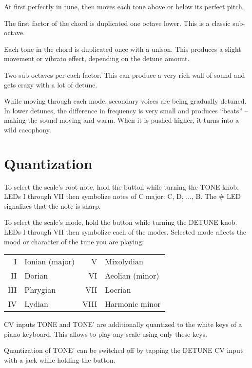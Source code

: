 \documentclass[10pt,nofoldmark,nocombine]{leaflet} %
\newenvironment{packed_enumerate_i}{
\begin{enumerate}[I]
  \setlength{\itemsep}{1pt}
  \setlength{\parskip}{0pt}
  \setlength{\parsep}{0pt}
}{\end{enumerate}}
\begin{document}
\begin{packed_enumerate_i}
  \item At first perfectly in tune, then moves each tone above or below its perfect pitch.
  \item The first factor of the chord is duplicated one octave lower. This is a classic sub-octave.
  \item Each tone in the chord is duplicated once with a unison. This produces a slight movement or vibrato effect, depending on the detune amount.
  \item Two sub-octaves per each factor. This can produce a very rich wall of sound and gets crazy with a lot of detune.
\end{packed_enumerate_i}

While moving through each mode, secondary voices are being gradually detuned. In lower detunes, the difference in frequency is very small and produces ``beats'' -- making the sound moving and warm. When it is pushed higher, it turns into a wild cacophony.

\section{Quantization}

To select the scale's root note, hold the button while turning the TONE knob. LEDs I through VII then symbolize notes of C major: C, D, ..., B. The \# LED signalizes that the note is sharp.

To select the scale's mode, hold the button while turning the DETUNE knob. LEDs I through VII then symbolize each of the modes. Selected mode affects the mood or character of the tune you are playing:

\begin{tabular}{@{}rl@{}@{}rl@{}}
  I & Ionian (major) \hspace{15mm} & V & Mixolydian  \\
  II & Dorian & VI & Aeolian (minor) \\
  III & Phrygian & VII & Locrian \\
  IV & Lydian & VIII & Harmonic minor \\
\end{tabular}

CV inputs TONE and TONE' are additionally quantized to the white keys of a piano keyboard. This allows to play any scale using only these keys.

Quantization of TONE' can be switched off by tapping the DETUNE CV input with a jack while holding the button.
\end{document}
